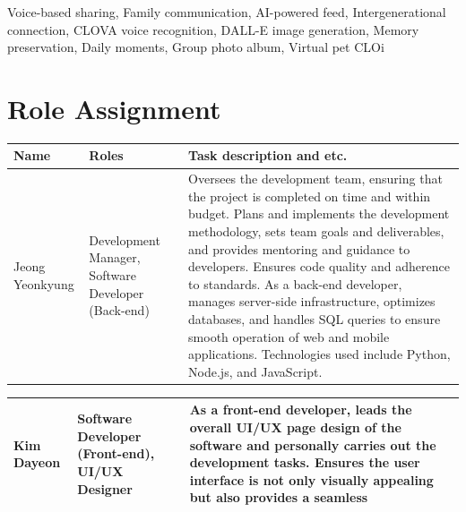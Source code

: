 \documentclass[conference]{IEEEtran}
\begin{document}
\begin{IEEEkeywords}
Voice-based sharing, Family communication, AI-powered feed, Intergenerational connection, CLOVA voice recognition, DALL-E image generation, Memory preservation, Daily moments, Group photo album, Virtual pet CLOi
\end{IEEEkeywords}

\section{Role Assignment}
\begin{table}[htbp]
\begin{tabular}{|p{1cm}|p{1.7cm}|p{5cm}|}
    \hline
    Name & Roles & Task description and etc. \\
    \hline
    Jeong Yeonkyung & Development Manager, Software Developer (Back-end) & Oversees the development team, ensuring that the project is completed on time and within budget. Plans and implements the development methodology, sets team goals and deliverables, and provides mentoring and guidance to developers. Ensures code quality and adherence to standards. As a back-end developer, manages server-side infrastructure, optimizes databases, and handles SQL queries to ensure smooth operation of web and mobile applications. Technologies used include Python, Node.js, and JavaScript.\\
    \hline
        \end{tabular}
\end{table}
\begin{table}[htbp]
    \begin{tabular}{|p{1cm}|p{1.7cm}|p{5cm}|}
    \hline
    Kim Dayeon & Software Developer (Front-end), UI/UX Designer & As a front-end developer, leads the overall UI/UX page design of the software and personally carries out the development tasks. Ensures the user interface is not only visually appealing but also provides a seamless \\
    \hline
    \end{tabular}
\end{table}
\end{document}
